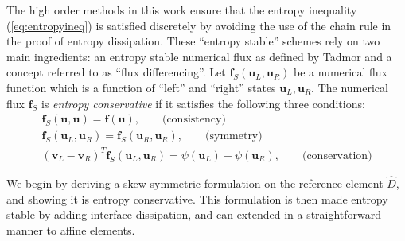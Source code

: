 \documentclass[review]{siamart0216}
\theoremstyle{assumption}
\renewcommand{\hat}[1]{\hat{#1}}
\newcommand{\LRp}[1]{\left( #1 \right)}
\renewcommand{\hat}{\widehat}
\begin{document}
The high order methods in this work ensure that the entropy inequality (\ref{eq:entropyineq}) is satisfied discretely by avoiding the use of the chain rule in the proof of entropy dissipation.  These ``entropy stable'' schemes rely on two main ingredients: an entropy stable numerical flux as defined by Tadmor \cite{tadmor1987numerical} and a concept referred to as ``flux differencing''.  %
Let $\bm{f}_S\LRp{\bm{u}_L,\bm{u}_R}$ be a numerical flux function which is a function of ``left'' and ``right'' states $\bm{u}_L,\bm{u}_R$.  
The numerical flux $\bm{f}_S$ is \textit{entropy conservative} if it satisfies the following three conditions:  
\begin{gather}
\bm{f}_S(\bm{u},\bm{u}) = \bm{f}(\bm{u}), \qquad \text{(consistency)}\\
\bm{f}_S(\bm{u}_L,\bm{u}_R) = \bm{f}_S(\bm{u}_R,\bm{u}_R), \qquad \text{(symmetry)}\nonumber\\
\LRp{\bm{v}_L-\bm{v}_R}^T\bm{f}_S(\bm{u}_L,\bm{u}_R) = \psi(\bm{u}_L) - \psi(\bm{u}_R), \qquad \text{(conservation)}\nonumber
\label{eq:esflux}
\end{gather}

We begin by deriving a skew-symmetric formulation on the reference element $\hat{D}$, and showing it is entropy conservative.  This formulation is then made entropy stable by adding interface dissipation, and can extended in a straightforward manner to affine elements.  
\end{document}

